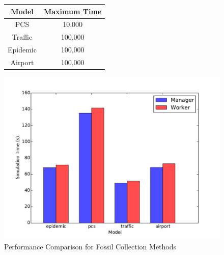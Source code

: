 \documentclass[11pt]{book}
\begin{document}
\begin{figure}
  \begin{minipage}{.5\textwidth}
    \begin{center}
      \begin{tabular}{| c | c |}
        \hline
        Model   & Maximum Time \\
        \hline
        PCS     & 10,000  \\
        Traffic & 100,000 \\
        Epidemic& 100,000 \\
        Airport & 100,000 \\
        \hline
      \end{tabular}
    \end{center}
  \end{minipage} \hfill
  \begin{minipage}{.5\textwidth}
    \begin{center}
      \includegraphics[width=\textwidth]{figs/fossil_collection/simulation_times.pdf}
    \end{center}
  \end{minipage}
  \caption{Performance Comparison for Fossil Collection Methods}\label{fc_times}
\end{figure}
\end{document}
